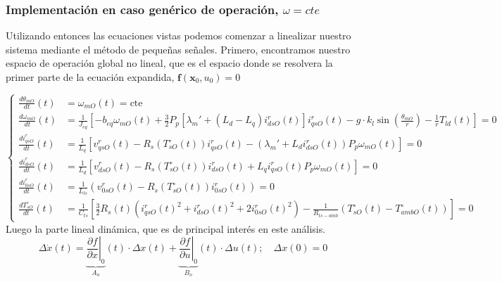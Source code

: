 \documentclass[12pt, a4paper,journal, onecolumn, compsoc]{IEEEtran}
\begin{document}
\subsubsection{Implementación en caso genérico de operación, \(\omega=cte\)}
Utilizando entonces las ecuaciones vistas podemos comenzar a linealizar nuestro sistema mediante el método de pequeñas señales.
Primero, encontramos nuestro espacio de operación global no lineal, que es el espacio donde se resolvera la primer parte de la ecuación expandida, $\bm{f}(\bm{x}_0,u_0)=0$

\begin{equation}
\left\{
    \begin{aligned}
        \frac{d\theta_{mO}}{dt}(t) &= \omega_{mO}(t) = \text{cte} \\[10pt]
        \frac{d\omega_{mO}}{dt}(t) &= \frac{1}{J_{eq}} \left[ -b_{eq}\omega_{mO}(t) + \frac{3}{2}P_p \left[ \lambda_m' + (L_d - L_q)i_{dsO}^r(t) \right] i_{qsO}^r(t) - g \cdot k_l \sin\left(\frac{\theta_{mO}}{r}\right) - \frac{1}{r}T_{ld}(t) \right] = 0 \\[10pt]
        \frac{di_{qsO}^r}{dt}(t) &= \frac{1}{L_q} \left[ v_{qsO}^r(t) - R_s(T_{sO}^\circ(t))i_{qsO}^r(t) - (\lambda_m' + L_d i_{dsO}^r(t))P_p \omega_{mO}(t) \right] = 0 \\[10pt]
        \frac{di_{dsO}^r}{dt}(t) &= \frac{1}{L_d} \left[ v_{dsO}^r(t) - R_s(T_{sO}^\circ(t))i_{dsO}^r(t) + L_q i_{qsO}^r(t)P_p \omega_{mO}(t) \right] = 0 \\[10pt]
        \frac{di_{0sO}^r}{dt}(t) &= \frac{1}{L_{ls}} \left( v_{0sO}^r(t) - R_s(T_{sO}^\circ(t))i_{0sO}^r(t) \right) = 0 \\[10pt]
        \frac{dT_{sO}^\circ}{dt}(t) &= \frac{1}{C_{ts}} \left[ \frac{3}{2}R_s(t) \left( i_{qsO}^r(t)^2 + i_{dsO}^r(t)^2 + 2i_{0sO}^r(t)^2 \right) - \frac{1}{R_{ts-amb}} (T_{sO}^\circ(t) - T_{ambO}^\circ(t)) \right] = 0
    \end{aligned}
\right.
\end{equation}
Luego la parte lineal dinámica, que es de principal interés en este análisis.
\begin{equation*}
    \Delta \dot{x}(t) = \underbrace{\left. \frac{\partial f}{\partial x} \right|_0}_{A_o} (t) \cdot \Delta x(t) + \underbrace{\left. \frac{\partial f}{\partial u} \right|_0}_{B_o} (t) \cdot \Delta u(t); \quad \Delta x(0) = 0
\end{equation*}
\end{document}
